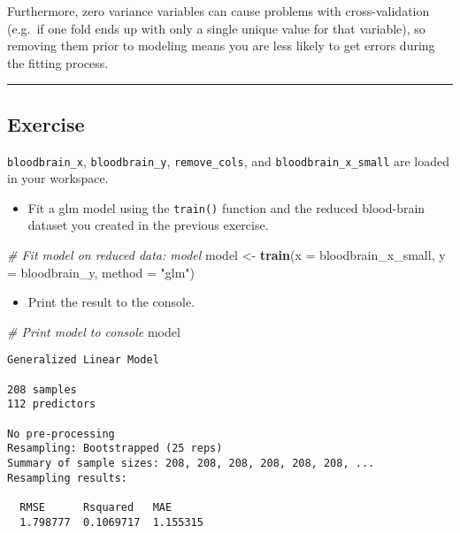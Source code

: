 \documentclass[]{book}
\newenvironment{Shaded}{\begin{snugshade}}{\end{snugshade}}
\newcommand{\KeywordTok}[1]{\textcolor[rgb]{0.13,0.29,0.53}{\textbf{#1}}}
\newcommand{\DataTypeTok}[1]{\textcolor[rgb]{0.13,0.29,0.53}{#1}}
\newcommand{\StringTok}[1]{\textcolor[rgb]{0.31,0.60,0.02}{#1}}
\newcommand{\CommentTok}[1]{\textcolor[rgb]{0.56,0.35,0.01}{\textit{#1}}}
\newcommand{\NormalTok}[1]{#1}
\providecommand{\tightlist}{%
  \setlength{\itemsep}{0pt}\setlength{\parskip}{0pt}}
\begin{document}
Furthermore, zero variance variables can cause problems with
cross-validation (e.g.~if one fold ends up with only a single unique
value for that variable), so removing them prior to modeling means you
are less likely to get errors during the fitting process.

\begin{center}\rule{0.5\linewidth}{\linethickness}\end{center}

\subsection*{Exercise}\label{exercise-27}

\texttt{bloodbrain\_x}, \texttt{bloodbrain\_y}, \texttt{remove\_cols},
and \texttt{bloodbrain\_x\_small} are loaded in your workspace.

\begin{itemize}
\tightlist
\item
  Fit a glm model using the \texttt{train()} function and the reduced
  blood-brain dataset you created in the previous exercise.
\end{itemize}

\begin{Shaded}
\begin{Highlighting}[]
\CommentTok{# Fit model on reduced data: model}
\NormalTok{model <-}\StringTok{ }\KeywordTok{train}\NormalTok{(}\DataTypeTok{x =}\NormalTok{ bloodbrain_x_small, }\DataTypeTok{y =}\NormalTok{ bloodbrain_y, }\DataTypeTok{method =} \StringTok{"glm"}\NormalTok{)}
\end{Highlighting}
\end{Shaded}

\begin{itemize}
\tightlist
\item
  Print the result to the console.
\end{itemize}

\begin{Shaded}
\begin{Highlighting}[]
\CommentTok{# Print model to console}
\NormalTok{model}
\end{Highlighting}
\end{Shaded}

\begin{verbatim}
Generalized Linear Model 

208 samples
112 predictors

No pre-processing
Resampling: Bootstrapped (25 reps) 
Summary of sample sizes: 208, 208, 208, 208, 208, 208, ... 
Resampling results:

  RMSE      Rsquared   MAE     
  1.798777  0.1069717  1.155315
\end{verbatim}
\end{document}
